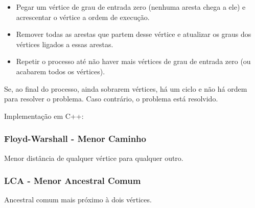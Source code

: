 \documentclass[a4paper,12pt]{article}
\begin{document}
\begin{itemize}
    \item Pegar um vértice de grau de entrada zero (nenhuma aresta chega a ele) e acrescentar o vértice a ordem de execução.
    \item Remover todas as arestas que partem desse vértice e atualizar os graus dos vértices ligados a essas arestas.
    \item Repetir o processo até não haver mais vértices de grau de entrada zero (ou acabarem todos os vértices).
\end{itemize}

\noindent Se, ao final do processo, ainda sobrarem vértices, há um ciclo e não há ordem para resolver o problema. Caso contrário, o problema está resolvido.

\noindent Implementação em C++:


\subsubsection{Floyd-Warshall - Menor Caminho}

Menor distância de qualquer vértice para qualquer outro.


\subsubsection{LCA - Menor Ancestral Comum}

Ancestral comum mais próximo à dois vértices.
\end{document}

